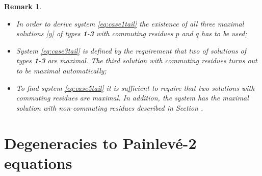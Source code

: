 \documentclass{article}
\theoremstyle{plain}
\newtheorem{remark}{Remark}
\begin{document}
\begin{remark} 
\phantom{}
\vspace{-0.2cm}
\begin{itemize}
    \item[\rm{i)}]
    In order to derive system \eqref{eq:case1tail} the existence of all three maximal solutions \eqref{y} of types {\bf 1}-{\bf 3} with commuting residues  $p$ and $q$ has to be used; 
    
    \vspace{-0.2cm}
    \item[\rm{ii)}]
    System \eqref{eq:case3tail} is defined by the requirement that two of solutions of types {\bf 1}-{\bf 3} are maximal. The third solution with commuting residues turns out to be maximal automatically; 
    
    \vspace{-0.2cm}
    \item[\rm{iii)}]
    To find  system \eqref{eq:case5tail} it is sufficient to require that two solutions with commuting residues are maximal. In addition, the system has the  maximal solution  with non-commuting residues described in Section \text{\rm\ref{sec213}}.
\end{itemize}
\end{remark} 

\section{Degeneracies to Painlev\'e-2 equations}\label{degeneracies}
\end{document}

